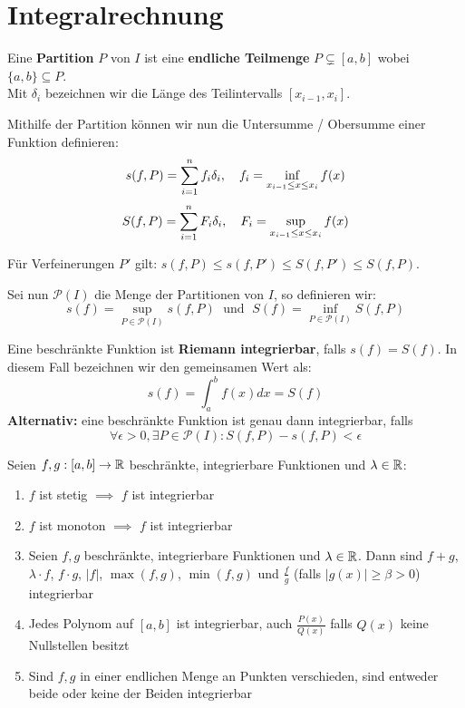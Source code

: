 \section{Integralrechnung}



\begin{tcolorbox}
    Eine \textbf{Partition} $P$ von $I$ ist eine \textbf{endliche Teilmenge} $P \subsetneq [a,b]$
    wobei $\{a,b\} \subseteq P$. \\

    Mit $\delta_i$ bezeichnen wir die Länge des Teilintervalls $[x_{i-1}, x_i]$.
\end{tcolorbox}

Mithilfe der Partition können wir nun die Untersumme / Obersumme einer Funktion definieren:
$$s(f,P) = \sum\limits_{i = 1}^n f_i \delta_i, \quad f_i = \inf_{x_{i-1} \leq x \leq x_i}f(x)$$
$$S(f,P) = \sum\limits_{i = 1}^n F_i \delta_i, \quad F_i = \sup_{x_{i-1} \leq x \leq x_i}f(x)$$

Für Verfeinerungen $P'$ gilt: $s(f,P) \leq s(f,P') \leq S(f,P') \leq S(f,P)$. \medskip

Sei nun $\mathcal{P}(I)$ die Menge der Partitionen von $I$, so definieren wir:
$$s(f) = \sup_{P \in \mathcal{P}(I)} s(f,P) \; \text{ und } \; S(f) = \inf_{P \in \mathcal{P}(I)} S(f,P)$$


\columnbreak


\begin{tcolorbox}
    \Satz Eine beschränkte Funktion ist \textbf{Riemann integrierbar}, falls $s(f) = S(f)$. In diesem Fall
    bezeichnen wir den gemeinsamen Wert als:
    $$s(f) = \int_a^b f(x)dx = S(f)$$
    \textbf{Alternativ:} eine beschränkte Funktion ist genau dann integrierbar, falls
    $$\forall \epsilon > 0, \exists P \in \mathcal{P}(I) : S(f,P) - s(f,P) < \epsilon$$
\end{tcolorbox}



Seien $f,g : [a,b] \to \mathbb{R}$ beschränkte, integrierbare Funktionen und $\lambda \in \mathbb{R}$:

\begin{enumerate}[label = (\arabic*)]
    \item $f$ ist stetig $\implies$ $f$ ist integrierbar
    \item $f$ ist monoton $\implies$ $f$ ist integrierbar
    \item Seien $f,g$ beschränkte, integrierbare Funktionen und $\lambda \in \mathbb{R}$. Dann sind $f+g$,
    $\lambda \cdot f$, $f \cdot g$, $|f|$, $\max(f,g)$, $\min(f,g)$ und $\frac{f}{g}$ (falls $|g(x)|
     \geq \beta > 0$) integrierbar
    \item Jedes Polynom auf $[a,b]$ ist integrierbar, auch $\frac{P(x)}{Q(x)}$ falls $Q(x)$ keine
    Nullstellen besitzt
    \item Sind $f, g$ in einer endlichen Menge an Punkten verschieden, sind entweder beide oder keine
    der Beiden integrierbar
\end{enumerate}

